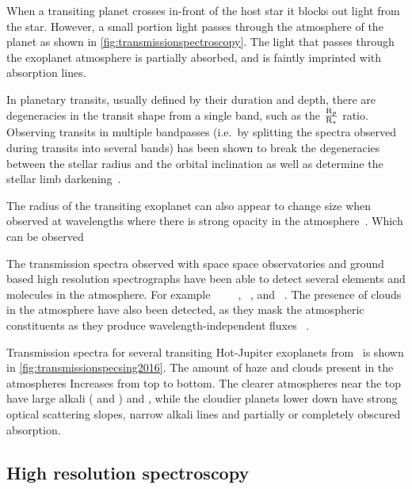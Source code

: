 When a transiting planet crosses in-front of the host star it blocks out light from the star.
However, a small portion light passes through the atmosphere of the planet as shown in \cref{fig:transmissionspectroscopy}.
The light that passes through the exoplanet atmosphere is partially absorbed, and is faintly imprinted with absorption lines.


In planetary transits, usually defined by their duration and depth, there are degeneracies in the transit shape from a single band, such as the \(\frac{\textrm{R}_{p}}{\textrm{R}_{\star}}\) ratio.
Observing transits in multiple bandpasses (i.e.\ by splitting the spectra observed during transits into several bands)  has been shown to break the degeneracies between the stellar radius and the orbital inclination as well as determine the stellar limb darkening~\citep{jha_multicolor_2000, knutson_using_2007}.

The radius of the transiting exoplanet can also appear to change size when observed at wavelengths where there is strong opacity in the atmosphere~\citep[e.g.][]{burrows_radii_2000, seager_theoretical_2000}.
Which can be observed

The transmission spectra observed with space space observatories and ground based high resolution spectrographs have been able to detect several elements and molecules in the atmosphere.
For example ~\citep{charbonneau_detection_2002, redfield_sodium_2008, wyttenbach_spectrally_2015, nikolov_vlt_2016} ~\cite{tinetti_water_2007, brogi_carbon_2014} ~\citep{brogi_carbon_2014, snellen_mass_2018}, ~\citep{redfield_extrasolar_2010},  and ~\citep{hoeijmakers_atomic_2018}.
The presence of clouds in the atmosphere have also been detected, as they mask the atmospheric constituents as they produce wavelength-independent fluxes ~\citep[e.g.][]{barman_clouds_2011, kreidberg_clouds_2014, sing_continuum_2016}.

Transmission spectra for several transiting Hot-Jupiter exoplanets from~\citet{sing_continuum_2016} is shown in \cref{fig:transmissionspecsing2016}.
The amount of haze and clouds present in the atmospheres Increases from top to bottom.
The clearer atmospheres near the top have large alkali ( and ) and , while the cloudier planets lower down have strong optical scattering slopes, narrow alkali lines and partially or completely obscured  absorption.


\subsection{High resolution spectroscopy}
\label{subsec:high_resolution_spectroscopy}

